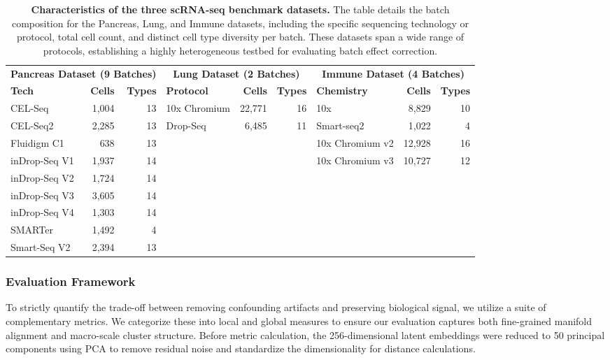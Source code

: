 \documentclass[unnumsec,webpdf,contemporary,large]{oup-authoring-template}%
\theoremstyle{thmstyleone}%
\theoremstyle{thmstyletwo}%
\theoremstyle{thmstylethree}%
\begin{document}
\begin{table}[h!]
\centering
\caption{\textbf{Characteristics of the three scRNA-seq benchmark datasets.} The table details the batch composition for the Pancreas, Lung, and Immune datasets, including the specific sequencing technology or protocol, total cell count, and distinct cell type diversity per batch. These datasets span a wide range of protocols, establishing a highly heterogeneous testbed for evaluating batch effect correction.}
\label{tab:batch_details}
\setlength{\tabcolsep}{4pt}
\begin{tabular}{lrrlrrlrr}
\toprule
\multicolumn{3}{c}{\textbf{Pancreas Dataset (9 Batches)}} & \multicolumn{3}{c}{\textbf{Lung Dataset (2 Batches)}} & \multicolumn{3}{c}{\textbf{Immune Dataset (4 Batches)}} \\
\cmidrule(lr){1-3} \cmidrule(lr){4-6} \cmidrule(lr){7-9}
\textbf{Tech} & \textbf{Cells} & \textbf{Types} & \textbf{Protocol} & \textbf{Cells} & \textbf{Types} & \textbf{Chemistry} & \textbf{Cells} & \textbf{Types} \\
\midrule
CEL-Seq & 1,004 & 13 & 10x Chromium & 22,771 & 16 & 10x & 8,829 & 10 \\
CEL-Seq2 & 2,285 & 13 & Drop-Seq & 6,485 & 11 & Smart-seq2 & 1,022 & 4 \\
Fluidigm C1 & 638 & 13 &  &  &  & 10x Chromium v2 & 12,928 & 16 \\
inDrop-Seq V1 & 1,937 & 14 &  &  &  & 10x Chromium v3 & 10,727 & 12 \\
inDrop-Seq V2 & 1,724 & 14 &  &  &  &  &  &  \\
inDrop-Seq V3 & 3,605 & 14 &  &  &  &  &  &  \\
inDrop-Seq V4 & 1,303 & 14 &  &  &  &  &  &  \\
SMARTer & 1,492 & 4 &  &  &  &  &  &  \\
Smart-Seq V2 & 2,394 & 13 &  &  &  &  &  &  \\
\bottomrule
\end{tabular}
\end{table}


\subsubsection{Evaluation Framework}
To strictly quantify the trade-off between removing confounding artifacts and preserving biological signal, we utilize a suite of complementary metrics. We categorize these into local and global measures to ensure our evaluation captures both fine-grained manifold alignment and macro-scale cluster structure. Before metric calculation, the 256-dimensional latent embeddings were reduced to 50 principal components using PCA to remove residual noise and standardize the dimensionality for distance calculations.
\end{document}
